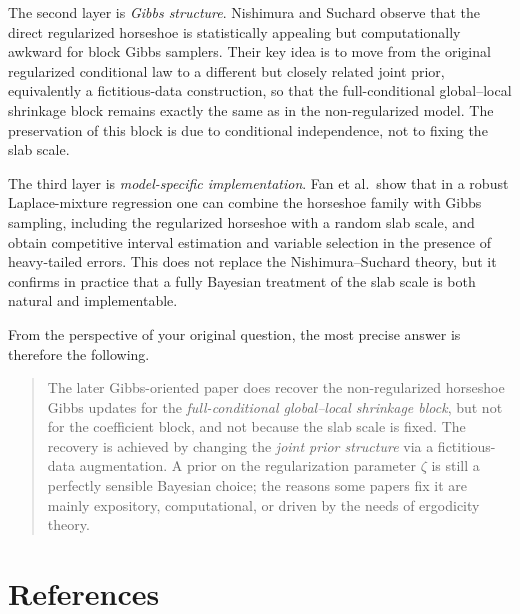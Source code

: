 \documentclass[11pt]{article}
\begin{document}
The second layer is \emph{Gibbs structure}. Nishimura and Suchard observe that the direct regularized horseshoe is statistically appealing but computationally awkward for block Gibbs samplers. Their key idea is to move from the original regularized conditional law to a different but closely related joint prior, equivalently a fictitious-data construction, so that the full-conditional global--local shrinkage block remains exactly the same as in the non-regularized model. The preservation of this block is due to conditional independence, not to fixing the slab scale.

The third layer is \emph{model-specific implementation}. Fan et al.\ show that in a robust Laplace-mixture regression one can combine the horseshoe family with Gibbs sampling, including the regularized horseshoe with a random slab scale, and obtain competitive interval estimation and variable selection in the presence of heavy-tailed errors. This does not replace the Nishimura--Suchard theory, but it confirms in practice that a fully Bayesian treatment of the slab scale is both natural and implementable.

From the perspective of your original question, the most precise answer is therefore the following.

\begin{quote}
The later Gibbs-oriented paper does recover the non-regularized horseshoe Gibbs updates for the \emph{full-conditional global--local shrinkage block}, but not for the coefficient block, and not because the slab scale is fixed. The recovery is achieved by changing the \emph{joint prior structure} via a fictitious-data augmentation. A prior on the regularization parameter $\zeta$ is still a perfectly sensible Bayesian choice; the reasons some papers fix it are mainly expository, computational, or driven by the needs of ergodicity theory.
\end{quote}

\section*{References}
\end{document}
